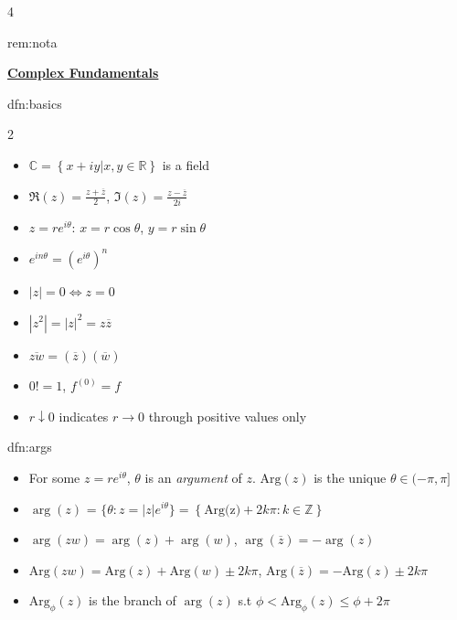 \documentclass[landscape, 8pt]{extarticle}
\begin{document}
\begin{multicols*}{4}
\begin{rem}[Notation]{rem:nota}{ }
			
		\end{rem}
		
		
		
		
		{\footnotesize \textbf{\underline{Complex Fundamentals}}}
		
		
		\begin{dfn}[Basics]{dfn:basics}{ }
			\vspace{-5pt}
			\begin{multicols}{2}
				\begin{itemize}
					\item $\mathbb{C} = \left\{x + iy | x, y \in \mathbb{R}\right\}$ is a field
					\item $\Re(z) = \frac{z + \overline{z}}{2}$, $\Im(z) = \frac{z - \overline{z}}{2 i}$
					\item $z = re^{i\theta}$: $x = r \cos\theta$, $y = r \sin\theta$
					\item $e^{in \theta} = (e^{i \theta})^n$
					\item $\left|z\right| = 0 \iff z = 0$
					\item $\left|z^2\right| = \left|z\right|^2 = z \overline{z}$
					\item $\overline{zw} = (\overline{z}) (\overline{w})$
					\item $0! = 1$, $f^{(0)} = f$
					\item $r \downarrow 0$ indicates $r \to 0$ through positive values only
				\end{itemize}
				
			\end{multicols}
		
		\end{dfn}
		
		
		\begin{dfn}{dfn:args}{ }
			\begin{itemize}
				\item For some $z = re^{i\theta}$, $\theta$ is an \textit{argument} of $z$. $\text{Arg}(z)$ is the unique $\theta \in (-\pi, \pi]$
				\item $\arg(z)$ = $\{\theta : z = \left|z\right| e^{i\theta}\} = \left\{ \text{Arg(z)} + 2k\pi : k \in \mathbb{Z}\right\}$
				\item $\arg(zw)  = \arg(z) + \arg(w)$, $\arg(\overline{z}) = -\arg(z)$
				\item $\text{Arg}(zw) = \text{Arg}(z) + \text{Arg}(w) \pm 2k \pi$, $\text{Arg}(\overline{z}) = -\text{Arg}(z) \pm 2k \pi$
				\item $\text{Arg}_\phi(z)$ is the branch of $\arg(z)$ s.t $\phi < \text{Arg}_\phi(z) \le \phi + 2\pi$
			\end{itemize}
			

\end{dfn}
\end{multicols*}
\end{document}
